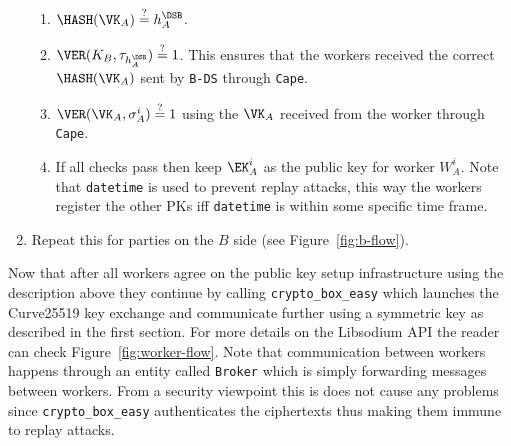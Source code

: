 \begin{enumerate}
  \begin{enumerate}
    \item $\HASH(\VK_A) \stackrel{?}{=} h_A^\DSB$.
    \item $\VER(K_B, \tau_{h_A^\DSB}) \stackrel{?}{=} 1$. This ensures that the workers
    received the correct $\HASH(\VK_A)$ sent by \verb|B-DS| through \verb|Cape|.
    \item $\VER(\VK_A, \sigma^i_A) \stackrel{?}{=} 1$
    using the $\VK_A$ received from the worker through \verb|Cape|.
    \item If all checks pass then keep $\EK_A^i$ as the public key for worker $W_A^i$.
    Note that \verb|datetime| is used to prevent replay attacks, this way the workers
    register the other PKs iff \verb|datetime| is within some specific time frame.
  \end{enumerate}

  \item Repeat this for parties on the $B$ side (see Figure~\ref{fig:b-flow}).
\end{enumerate}

Now that after all workers agree on the public key setup infrastructure
using the description above they continue by calling \verb|crypto_box_easy|
which launches the Curve25519 key exchange and communicate further using a
symmetric key as described in the first section. For more details on the Libsodium API
the reader can check Figure~\ref{fig:worker-flow}. Note that communication
between workers happens through an entity called \verb|Broker| which is
simply forwarding messages between workers. From a security viewpoint this is does not cause
any problems since \verb|crypto_box_easy| authenticates the ciphertexts thus making them
immune to replay attacks.




